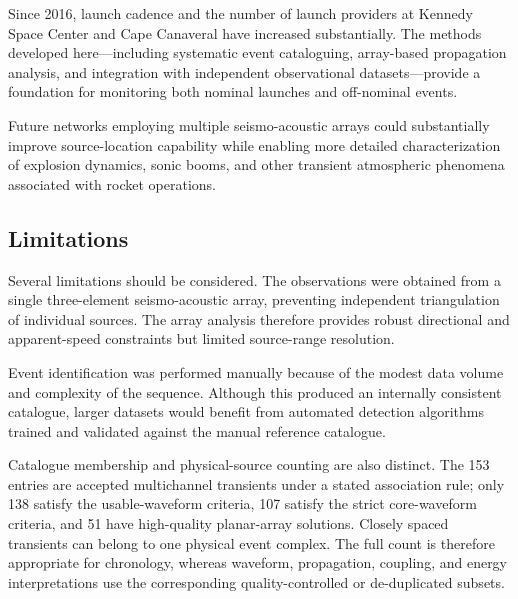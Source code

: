 \documentclass[]{seismica}
\begin{document}
Since 2016, launch cadence and the number of launch providers at Kennedy Space Center and Cape Canaveral have increased substantially. The methods developed here---including systematic event cataloguing, array-based propagation analysis, and integration with independent observational datasets---provide a foundation for monitoring both nominal launches and off-nominal events.

Future networks employing multiple seismo-acoustic arrays could substantially improve source-location capability while enabling more detailed characterization of explosion dynamics, sonic booms, and other transient atmospheric phenomena associated with rocket operations.

\subsection{Limitations}
\label{sec:discussion_limitations}

Several limitations should be considered. The observations were obtained from a single three-element seismo-acoustic array, preventing independent triangulation of individual sources. The array analysis therefore provides robust directional and apparent-speed constraints but limited source-range resolution.


Event identification was performed manually because of the modest data volume and complexity of the sequence. Although this produced an internally consistent catalogue, larger datasets would benefit from automated detection algorithms trained and validated against the manual reference catalogue.

Catalogue membership and physical-source counting are also distinct. The 153
entries are accepted multichannel transients under a stated association rule;
only 138 satisfy the usable-waveform criteria, 107 satisfy the strict
core-waveform criteria, and 51 have high-quality planar-array solutions.
Closely spaced transients can belong to one physical event complex. The full
count is therefore appropriate for chronology, whereas waveform, propagation,
coupling, and energy interpretations use the corresponding quality-controlled
or de-duplicated subsets.
\end{document}
